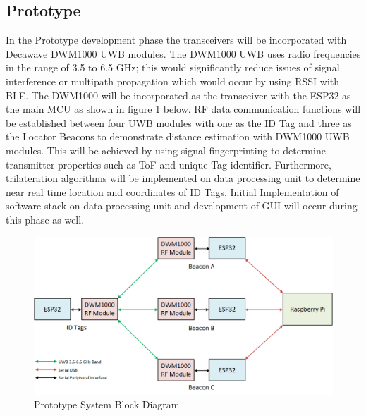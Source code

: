 \subsection{Prototype}
\medskip
In the Prototype development phase the transceivers will be incorporated with Decawave DWM1000 UWB modules. The DWM1000 UWB uses radio frequencies in the range of 3.5 to 6.5 GHz; this would significantly reduce issues of signal interference or multipath propagation which would occur by using RSSI with BLE. The DWM1000 will be incorporated as the transceiver with the ESP32 as the main MCU as shown in figure \ref{prototype} below. RF data communication functions will be established between four UWB modules with one as the ID Tag and three as the Locator Beacons to demonstrate distance estimation with DWM1000 UWB modules. This will be achieved by using signal fingerprinting to determine transmitter properties such as ToF and unique Tag identifier. Furthermore, trilateration algorithms will be implemented on data processing unit to determine near real time location and coordinates of ID Tags. Initial Implementation of software stack on data processing unit and development of GUI will occur during this phase as well.

\bigskip
\begin{figure}[H]
\centering
    \includegraphics[width=\linewidth]{./images/02_prototype.png}
    \caption{Prototype System Block Diagram}
    \label{prototype}
\end{figure}


\pagebreak
